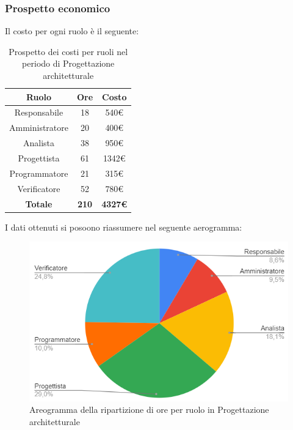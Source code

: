 \subsubsection{Prospetto economico}
Il costo per ogni ruolo è il seguente:
\begin{table}[H]
		\begin{center}
			\setlength{\aboverulesep}{0pt}
			\setlength{\belowrulesep}{0pt}
			\setlength{\extrarowheight}{.75ex}
			\begin{tabular}{ c c c }
				\rowcolor{AzzurroGruppo!30} 
				\textbf{Ruolo} & \textbf{Ore} & \textbf{Costo}  \\
				\toprule
				Responsabile   & 18 & 540€ \\
				Amministratore & 20 & 400€ \\
				Analista       & 38 & 950€ \\
				Progettista    & 61 & 1342€ \\
				Programmatore  & 21 & 315€ \\
				Verificatore   & 52 & 780€ \\
				\textbf{Totale} & \textbf{210} & \textbf{4327€} \\
				\bottomrule
			\end{tabular}
			\caption{ Prospetto dei costi per ruoli nel periodo di Progettazione architetturale}
		\end{center}
	\end{table}
I dati ottenuti si posoono riassumere nel seguente aerogramma:
\begin{figure}[H]
    \centering
    \includegraphics[scale = 0.5]{components/img/architettura_torta.png}
    \caption{ Areogramma della ripartizione di ore per ruolo in Progettazione architetturale}
    \label{fig:logo}
\end{figure}
